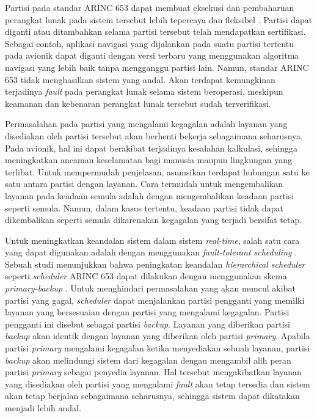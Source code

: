 Partisi pada standar ARINC 653 dapat membuat eksekusi dan pembaharuan perangkat lunak pada
sistem tersebut lebih tepercaya dan fleksibel \citep{Jin2013}.  Partisi dapat diganti atau
ditambahkan selama partisi tersebut telah mendapatkan sertifikasi. Sebagai contoh, aplikasi
navigasi yang dijalankan pada suatu partisi tertentu pada avionik dapat diganti dengan versi
terbaru yang menggunakan algoritma navigasi yang lebih baik tanpa mengganggu partisi lain.
Namun, standar ARINC 653 tidak menghasilkan sistem yang andal. Akan terdapat kemungkinan
terjadinya \textit{fault} pada perangkat lunak selama sistem beroperasi, meskipun keamanan dan
kebenaran perangkat lunak tersebut sudah terverifikasi. 

Permasalahan pada partisi yang mengalami kegagalan adalah layanan yang disediakan oleh partisi
tersebut akan berhenti bekerja sebagaimana seharusnya. Pada avionik, hal ini dapat berakibat
terjadinya kesalahan kalkulasi, sehingga meningkatkan ancaman keselamatan bagi manusia maupun
lingkungan yang terlibat. Untuk mempermudah penjelasan, asumsikan terdapat hubungan satu ke satu
antara partisi dengan layanan. Cara termudah untuk mengembalikan layanan pada keadaan semula
adalah dengan mengembalikan keadaan partisi seperti semula. Namun, dalam kasus tertentu, keadaan
partisi tidak dapat dikembalikan seperti semula dikarenakan kegagalan yang terjadi bersifat
tetap.

Untuk meningkatkan keandalan sistem dalam sistem \textit{real-time}, salah satu cara yang dapat
digunakan adalah dengan menggunakan \textit{fault-tolerant scheduling} \citep{Campbell1986}
\citep{Han2003} \citep{Shin2008}. Sebuah studi menunjukkan bahwa peningkatan keandalan
\textit{hierarchical scheduler} seperti \textit{scheduler} ARINC 653 dapat dilakukan dengan
menggunakan skema \textit{primary-backup} \citep{Hyun2012}. Untuk menghindari permasalahan yang
akan muncul akibat partisi yang gagal, \textit{scheduler} dapat menjalankan partisi pengganti
yang memilki layanan yang bersesuaian dengan partisi yang mengalami kegagalan. Partisi pengganti
ini disebut sebagai partisi \textit{backup}. Layanan yang diberikan partisi \textit{backup} akan
identik dengan layanan yang diberikan oleh partisi \textit{primary}. Apabila partisi
\textit{primary} mengalami kegagalan ketika menyediakan sebuah layanan, partisi \textit{backup}
akan melindungi sistem dari kegagalan dengan mengambil alih peran partisi \textit{primary}
sebagai penyedia layanan. Hal tersebut mengakibatkan layanan yang disediakan oleh partisi yang
mengalami \textit{fault} akan tetap tersedia dan sistem akan tetap berjalan sebagaimana
seharusnya, sehingga sistem dapat dikatakan menjadi lebih andal.

